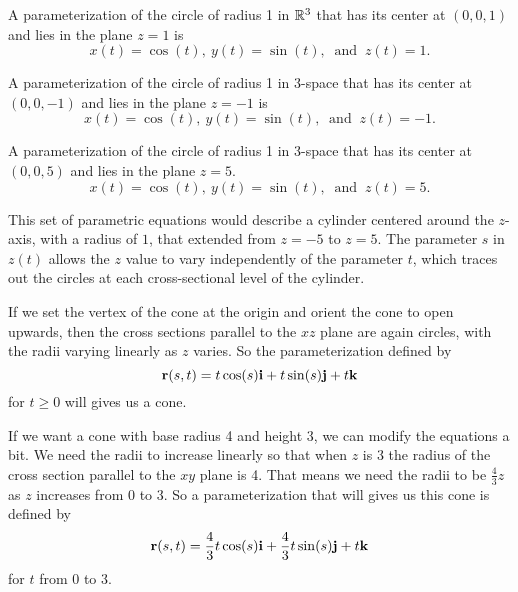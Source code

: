 \begin{activitySolution}

    \ba
        \item A parameterization of the circle of radius 1 in $\mathbb{R}^3$ that has its center at $(0,0,1)$ and lies in the plane $z=1$ is
\[x(t) = \cos(t), \ y(t) = \sin(t), \ \text{ and } \ z(t) = 1.\]

        \item A parameterization of the circle of radius 1 in 3-space that has its center at $(0,0,-1)$ and lies in the plane $z=-1$ is
\[x(t) = \cos(t), \ y(t) = \sin(t), \ \text{ and } \ z(t) = -1.\]

        \item A parameterization of the circle of radius 1 in 3-space that has its center at $(0,0,5)$ and lies in the plane $z=5$.
\[x(t) = \cos(t), \ y(t) = \sin(t), \ \text{ and } \ z(t) = 5.\]

        \item This set of parametric equations would describe a cylinder centered around the $z$-axis, with a radius of $1$, that extended from $z=-5$ to $z=5$. The parameter $s$ in $z(t)$ allows the $z$ value to vary independently of the parameter $t$, which traces out the circles at each cross-sectional level of the cylinder.

    \item If we set the vertex of the cone at the origin and orient the cone to open upwards, then the cross sections parallel to the $xz$ plane are again circles, with the radii varying linearly as $z$ varies. So the parameterization defined by 
\[\mathbf{r}(s,t) = t \cos(s) \mathbf{i} + t \sin(s) \mathbf{j} + t \mathbf{k}\]
for $t \geq 0$ will gives us a cone.

If we want a cone with base radius 4 and height 3, we can modify the equations a bit. We need the radii to increase linearly so that when $z$ is 3 the radius of the cross section parallel to the $xy$ plane is 4. That means we need the radii to be $\frac{4}{3}z$ as $z$ increases from 0 to 3. So a parameterization that will gives us this cone is defined by
\[\mathbf{r}(s,t) = \frac{4}{3}t \cos(s) \mathbf{i} + \frac{4}{3} t \sin(s) \mathbf{j} + t \mathbf{k}\]
for $t$ from 0 to 3.

    \ea


\end{activitySolution}    

\afterpa 